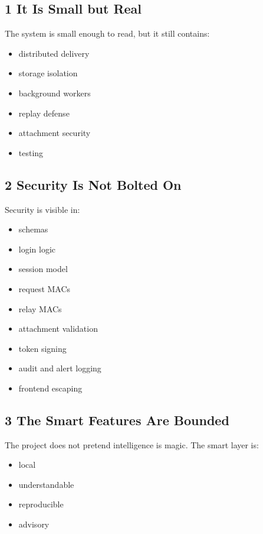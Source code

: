 \documentclass[11pt,a4paper]{article}
\begin{document}
\subsection{1 It Is Small but Real}

The system is small enough to read, but it still contains:

\begin{itemize}
\item distributed delivery
\item storage isolation
\item background workers
\item replay defense
\item attachment security
\item testing
\end{itemize}

\subsection{2 Security Is Not Bolted On}

Security is visible in:

\begin{itemize}
\item schemas
\item login logic
\item session model
\item request MACs
\item relay MACs
\item attachment validation
\item token signing
\item audit and alert logging
\item frontend escaping
\end{itemize}

\subsection{3 The Smart Features Are Bounded}

The project does not pretend intelligence is magic. The smart layer is:

\begin{itemize}
\item local
\item understandable
\item reproducible
\item advisory
\end{itemize}
\end{document}
